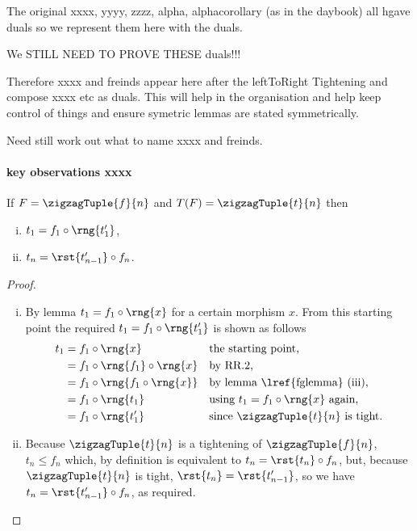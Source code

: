 \begin{notebox}
The original xxxx, yyyy, zzzz, alpha, alphacorollary
(as in the daybook) all hgave duals so we represent them here
with the duals.

We STILL NEED TO PROVE THESE duals!!! 

Therefore  xxxx and freinds appear here after the leftToRight Tightening and compose xxxx etc as duals. This will help in the organisation and help keep control of things and ensure symetric lemmas are stated symmetrically.

Need still work out what to name xxxx and freinds. 
\end{notebox}

\paragraph*{key observations xxxx}
\begin{lemma}
If $F=\zigzagTuple{f}{n}$ and $T(F)=\zigzagTuple{t}{n}$ then
\begin{enumerate}[(i)]
\item $t_1 = f_1 \circ \rng{t'_1}$,
\item $t_n = \rst{t'_{n-1}} \circ f_n$.
\end{enumerate}
\end{lemma}
\begin{proof}
~ %
\begin{enumerate}[(i)]
\item
By lemma 
$t_1=f_1 \circ \rng{x}$
for a certain morphism $x$.
From this starting point the required 
$t_1 = f_1 \circ \rng{t'_1}$
is shown as follows
\begin{align*}
t_1 &= f_1 \circ \rng{x} 
        &&\mbox{the starting point,} \\
    &= f_1 \circ \rng{f_1} \circ \rng{x}
        && \mbox{by RR.2,}  \\
    &= f_1 \circ \rng{f_1 \circ \rng{x}}
        && \mbox{by lemma \lref{fglemma} (iii),} \\
    &= f_1 \circ \rng{t_1}
        && \mbox{using $t_1=f_1 \circ \rng{x}$ again,} \\
    &= f_1 \circ \rng{t'_1}
        && \mbox{since $\zigzagTuple{t}{n}$ is tight.}
\end{align*}
\item
Because $\zigzagTuple{t}{n}$
is a tightening of $\zigzagTuple{f}{n}$,
$t_n \leq f_n$ which, by definition is equivalent to
$t_n=\rst{t_n} \circ f_n$, but, because 
$\zigzagTuple{t}{n}$ is tight, $\rst{t_n}= \rst{t'_{n-1}}$,
 so we have $t_n=\rst{t'_{n-1}} \circ f_n$, as required.
\end{enumerate}
\end{proof}
